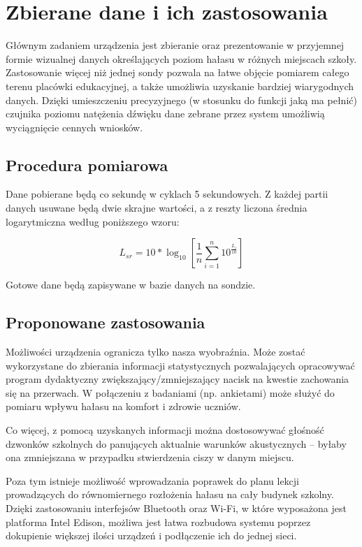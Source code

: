 \documentclass[12pt, a4paper]{article}
\begin{document}
\section{Zbierane dane i ich zastosowania}

Głównym zadaniem urządzenia jest zbieranie oraz prezentowanie w przyjemnej formie wizualnej danych określających poziom hałasu w różnych miejscach szkoły. Zastosowanie więcej niż jednej sondy pozwala na łatwe objęcie pomiarem całego terenu placówki edukacyjnej, a także umożliwia uzyskanie bardziej wiarygodnych danych. Dzięki umieszczeniu precyzyjnego (w stosunku do funkcji jaką ma pełnić) czujnika poziomu natężenia dźwięku dane zebrane przez system umożliwią wyciągnięcie cennych wniosków.

\subsection{Procedura pomiarowa}

Dane pobierane będą co sekundę w cyklach 5 sekundowych. Z każdej partii danych usuwane będą dwie skrajne wartości, a z reszty liczona średnia logarytmiczna według poniższego wzoru\cite{log}:

\Large
\begin{equation}
L_{sr} = 10*\log_{10}\left[\frac{1}{n}\displaystyle\sum_{i=1}^{n}10^{\frac{L_i}{10}}\right]
\end{equation}
\normalsize

Gotowe dane będą zapisywane w bazie danych na sondzie.

\subsection{Proponowane zastosowania}

Możliwości urządzenia ogranicza tylko nasza wyobraźnia. Może zostać wykorzystane do zbierania informacji statystycznych pozwalających opracowywać program dydaktyczny zwiększający/zmniejszający nacisk na kwestie zachowania się na przerwach. W połączeniu z badaniami (np. ankietami) może służyć do pomiaru wpływu hałasu na komfort i zdrowie uczniów.

Co więcej, z pomocą uzyskanych informacji można dostosowywać głośność dzwonków szkolnych do panujących aktualnie warunków akustycznych -- byłaby ona zmniejszana w przypadku stwierdzenia ciszy w danym miejscu.

Poza tym istnieje możliwość wprowadzania poprawek do planu lekcji prowadzących do równomiernego rozłożenia hałasu na cały budynek szkolny. Dzięki zastosowaniu interfejsów Bluetooth oraz Wi-Fi, w które wyposażona jest platforma Intel Edison, możliwa jest łatwa rozbudowa systemu poprzez dokupienie większej ilości urządzeń i podłączenie ich do jednej sieci.
\end{document}
